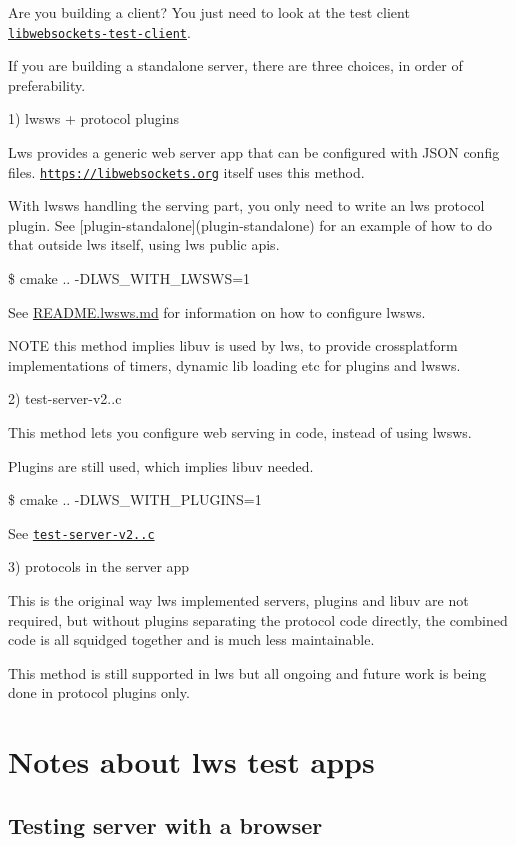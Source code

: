 Are you building a client? You just need to look at the test client \href{test-server/test-client.c}{\tt libwebsockets-\/test-\/client}.

If you are building a standalone server, there are three choices, in order of preferability.

1) lwsws + protocol plugins

Lws provides a generic web server app that can be configured with J\+S\+ON config files. \href{https://libwebsockets.org}{\tt https\+://libwebsockets.\+org} itself uses this method.

With lwsws handling the serving part, you only need to write an lws protocol plugin. See \mbox{[}plugin-\/standalone\mbox{]}(plugin-\/standalone) for an example of how to do that outside lws itself, using lws public apis.

\$ cmake .. -\/\+D\+L\+W\+S\+\_\+\+W\+I\+T\+H\+\_\+\+L\+W\+S\+WS=1

See \hyperlink{md_README.lwsws}{R\+E\+A\+D\+ME.lwsws.md} for information on how to configure lwsws.

N\+O\+TE this method implies libuv is used by lws, to provide crossplatform implementations of timers, dynamic lib loading etc for plugins and lwsws.

2) test-\/server-\/v2..\+c

This method lets you configure web serving in code, instead of using lwsws.

Plugins are still used, which implies libuv needed.

\$ cmake .. -\/\+D\+L\+W\+S\+\_\+\+W\+I\+T\+H\+\_\+\+P\+L\+U\+G\+I\+NS=1

See \href{test-server/test-server-v2.0.c}{\tt test-\/server-\/v2..\+c}

3) protocols in the server app

This is the original way lws implemented servers, plugins and libuv are not required, but without plugins separating the protocol code directly, the combined code is all squidged together and is much less maintainable.

This method is still supported in lws but all ongoing and future work is being done in protocol plugins only.

\section*{Notes about lws test apps }

\subsection*{Testing server with a browser }

